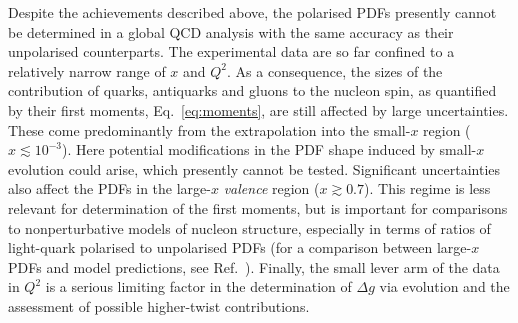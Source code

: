 Despite the achievements described above, the polarised PDFs presently cannot 
be determined in a global QCD analysis with the same accuracy as their 
unpolarised counterparts.
%
The experimental data are so far confined to a relatively narrow range of 
$x$ and $Q^2$.
%
As a consequence, the sizes of the contribution of quarks, antiquarks and 
gluons to the nucleon spin, as quantified by their first moments, 
Eq.~\eqref{eq:moments}, are still affected by large uncertainties. 
%
These come predominantly from the extrapolation into the small-$x$ region 
($x\lesssim 10^{-3}$). 
%
Here potential modifications in the PDF shape induced by small-$x$ evolution 
could arise, which presently cannot be tested.
%
Significant uncertainties also affect the PDFs in the large-$x$ 
{\it valence} region ($x\gtrsim 0.7$). 
%
This regime is less relevant for determination of the first moments, but is 
important for comparisons to nonperturbative models of nucleon structure, 
especially in terms of ratios of light-quark polarised to unpolarised PDFs 
(for a comparison between large-$x$ PDFs 
and model predictions, see Ref.~\cite{Nocera:2014uea}).
%
Finally, the small lever arm of the data in $Q^2$ is a serious limiting factor 
in the determination of $\Delta g$ via evolution and the assessment of possible 
higher-twist contributions. 

